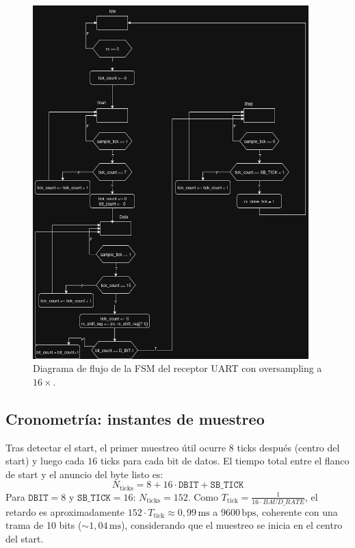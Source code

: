 \begin{figure}[H]
    \centering
    \includegraphics[width=0.95\textwidth]{img/diagramaReceiverUART.png}
    \caption{Diagrama de flujo de la FSM del receptor UART con oversampling a \(16\times\).}
    \label{fig:uart-rx-fsm}
\end{figure}

\subsection{Cronometría: instantes de muestreo}
Tras detectar el start, el primer muestreo útil ocurre \(8\) ticks después (centro del start) y luego cada \(16\) ticks para cada bit de datos. El tiempo total entre el flanco de start y el anuncio del byte listo es:
\[
N_{\text{ticks}} = 8 + 16\cdot \texttt{DBIT} + \texttt{SB\_TICK}
\]
Para \(\texttt{DBIT}=8\) y \(\texttt{SB\_TICK}=16\): \(N_{\text{ticks}}=152\).  
Como \(T_{\text{tick}}=\tfrac{1}{16\cdot BAUD\_RATE}\), el retardo es aproximadamente \(152 \cdot T_{\text{tick}} \approx 0{,}99\,\text{ms}\) a \(9600\,\text{bps}\), coherente con una trama de 10 bits (\(\sim 1{,}04\,\text{ms}\)), considerando que el muestreo se inicia en el centro del start.

